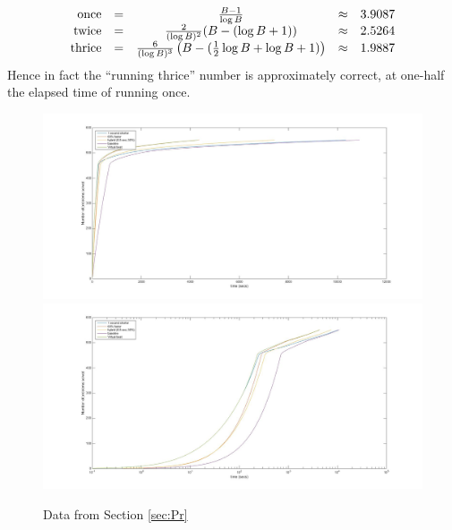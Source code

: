 \documentclass{easychair}
\begin{document}
\begin{equation*}
\begin{array}{rcccl}
\hbox{once}&=&\frac{B-1}{\log B}&\approx&3.9087\\
\hbox{twice}&=&\frac{2}{(\log B)^2}(B-(\log B +1))&\approx&2.5264\\
\hbox{thrice}&=&\frac{6}{(\log B)^3}\left(B-(\frac12\log B+\log B +1)\right)&\approx&1.9887\\
\end{array}
\end{equation*}
Hence in fact the ``running thrice'' number is approximately correct, at one-half the elapsed time of running once.

\begin{figure}[h]
\caption{Data from Section \ref{sec:Pr}\label{Fig:S2}}
\includegraphics[scale=0.25]{Fig2a.jpg}
\includegraphics[scale=0.25]{Fig2b.jpg}
\end{figure}
\clearpage
\end{document}

